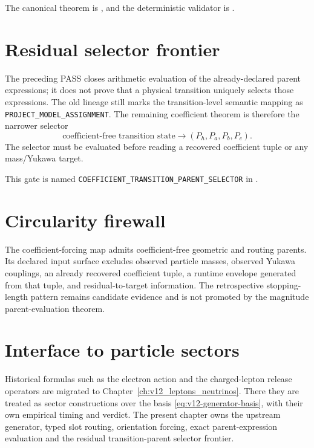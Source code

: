 The canonical theorem is
,
and the deterministic validator is
.

\section{Residual selector frontier}
The preceding PASS closes arithmetic evaluation of the already-declared parent
expressions; it does not prove that a physical transition uniquely selects those
expressions. The old lineage still marks the transition-level semantic mapping
as \texttt{PROJECT\_MODEL\_ASSIGNMENT}. The remaining coefficient theorem is
therefore the narrower selector
\begin{equation}
\boxed{
\text{coefficient-free transition state}
\longrightarrow
(P_h,P_a,P_b,P_c).
}
\label{eq:v12-coefficient-parent-selector}
\end{equation}
The selector must be evaluated before reading a recovered coefficient tuple or
any mass/Yukawa target.

This gate is named \texttt{COEFFICIENT\_TRANSITION\_PARENT\_SELECTOR} in
.

\section{Circularity firewall}
The coefficient-forcing map admits coefficient-free geometric and routing
parents. Its declared input surface excludes observed particle masses,
observed Yukawa couplings, an already recovered coefficient tuple, a runtime
envelope generated from that tuple, and residual-to-target information. The
retrospective stopping-length pattern remains candidate evidence and is not
promoted by the magnitude parent-evaluation theorem.

\section{Interface to particle sectors}
Historical formulas such as the electron action and the charged-lepton release
operators are migrated to Chapter~\ref{ch:v12_leptons_neutrinos}. There they
are treated as sector constructions over the basis
\eqref{eq:v12-generator-basis}, with their own empirical timing and verdict.
The present chapter owns the upstream generator, typed slot routing, orientation
forcing, exact parent-expression evaluation and the residual transition-parent
selector frontier.

